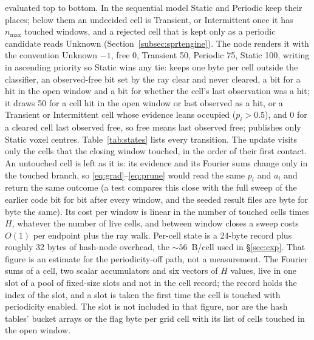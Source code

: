 evaluated top to bottom. In the sequential model Static and Periodic keep their places; below them an undecided cell is Transient, or Intermittent once it has $n_{\max}$ touched windows, and a rejected cell that is kept only as a periodic candidate reads Unknown (Section~\ref{subsec:sprtengine}). The node renders it with the convention Unknown $-1$, free 0, Transient 50, Periodic 75, Static 100, writing in ascending priority so Static wins any tie:  keeps one byte per cell outside the classifier, an observed-free bit set by the ray clear and never cleared, a bit for a hit in the open window and a bit for whether the cell's last observation was a hit; it draws 50 for a cell hit in the open window or last observed as a hit, or a Transient or Intermittent cell whose evidence leans occupied ($p_i>0.5$), and 0 for a cleared cell last observed free, so free means last observed free;  publishes only Static voxel centres. Table~\ref{tab:states} lists every transition. The update visits only the cells that the closing window touched, in the order of their first contact. An untouched cell is left as it is: its evidence and its Fourier sums change only in the touched branch, so \eqref{eq:grad}--\eqref{eq:prune} would read the same $p_i$ and $a_i$ and return the same outcome (a test compares this close with the full sweep of the earlier code bit for bit after every window, and the seeded result files are byte for byte the same). Its cost per window is linear in the number of touched cells times $H$, whatever the number of live cells, and between window closes a sweep costs $O(1)$ per endpoint plus the ray walk. Per-cell state is a 24-byte record plus roughly 32 bytes of hash-node overhead, the ${\sim}56$~B/cell used in \S\ref{sec:exp}. That figure is an estimate for the periodicity-off path, not a measurement. The Fourier sums of a cell, two scalar accumulators and six vectors of $H$ values, live in one slot of a pool of fixed-size slots and not in the cell record; the record holds the index of the slot, and a slot is taken the first time the cell is touched with periodicity enabled. The slot is not included in that figure, nor are the hash tables' bucket arrays or the  flag byte per grid cell with its list of cells touched in the open window.

